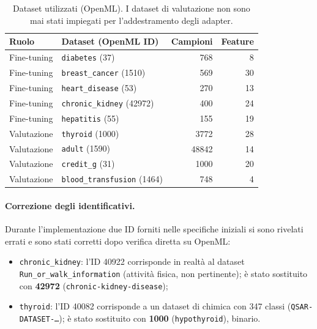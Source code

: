 \documentclass[11pt,a4paper]{article}
\begin{document}
\begin{table}[h]
\centering
\caption{Dataset utilizzati (OpenML). I dataset di valutazione non sono mai
stati impiegati per l'addestramento degli adapter.}
\label{tab:dataset}
\small
\begin{tabular}{llrr}
\toprule
Ruolo & Dataset (OpenML ID) & Campioni & Feature \\
\midrule
Fine-tuning & \texttt{diabetes} (37)            & 768  & 8  \\
Fine-tuning & \texttt{breast\_cancer} (1510)    & 569  & 30 \\
Fine-tuning & \texttt{heart\_disease} (53)      & 270  & 13 \\
Fine-tuning & \texttt{chronic\_kidney} (42972)  & 400  & 24 \\
Fine-tuning & \texttt{hepatitis} (55)           & 155  & 19 \\
\midrule
Valutazione & \texttt{thyroid} (1000)           & 3772 & 28 \\
Valutazione & \texttt{adult} (1590)             & 48842& 14 \\
Valutazione & \texttt{credit\_g} (31)           & 1000 & 20 \\
Valutazione & \texttt{blood\_transfusion} (1464)& 748  & 4  \\
\bottomrule
\end{tabular}
\end{table}

\paragraph{Correzione degli identificativi.} Durante l'implementazione due ID
forniti nelle specifiche iniziali si sono rivelati errati e sono stati corretti
dopo verifica diretta su OpenML:
\begin{itemize}[nosep]
  \item \texttt{chronic\_kidney}: l'ID 40922 corrisponde in realtà al dataset
  \texttt{Run\_or\_walk\_information} (attività fisica, non pertinente); è stato
  sostituito con \textbf{42972} (\texttt{chronic-kidney-disease});
  \item \texttt{thyroid}: l'ID 40082 corrisponde a un dataset di chimica con 347
  classi (\texttt{QSAR-DATASET-\dots}); è stato sostituito con \textbf{1000}
  (\texttt{hypothyroid}), binario.
\end{itemize}
\end{document}
